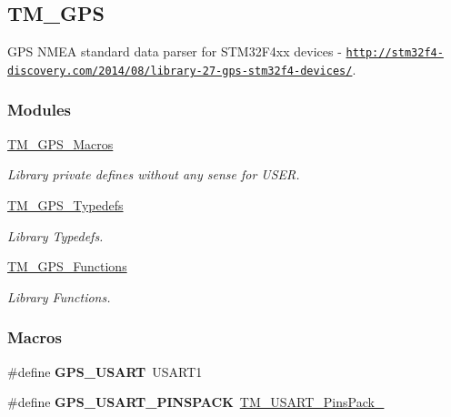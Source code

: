 \hypertarget{group___t_m___g_p_s}{}\subsection{T\+M\+\_\+\+G\+P\+S}
\label{group___t_m___g_p_s}


G\+P\+S N\+M\+E\+A standard data parser for S\+T\+M32\+F4xx devices -\/ \href{http://stm32f4-discovery.com/2014/08/library-27-gps-stm32f4-devices/}{\tt http\+://stm32f4-\/discovery.\+com/2014/08/library-\/27-\/gps-\/stm32f4-\/devices/}.  


\subsubsection*{Modules}
\begin{DoxyCompactItemize}
\item 
\hyperlink{group___t_m___g_p_s___macros}{T\+M\+\_\+\+G\+P\+S\+\_\+\+Macros}
\begin{DoxyCompactList}\small\item\em Library private defines without any sense for U\+S\+E\+R. \end{DoxyCompactList}\item 
\hyperlink{group___t_m___g_p_s___typedefs}{T\+M\+\_\+\+G\+P\+S\+\_\+\+Typedefs}
\begin{DoxyCompactList}\small\item\em Library Typedefs. \end{DoxyCompactList}\item 
\hyperlink{group___t_m___g_p_s___functions}{T\+M\+\_\+\+G\+P\+S\+\_\+\+Functions}
\begin{DoxyCompactList}\small\item\em Library Functions. \end{DoxyCompactList}\end{DoxyCompactItemize}
\subsubsection*{Macros}
\begin{DoxyCompactItemize}
\item 
\hypertarget{group___t_m___g_p_s_ga3507266065ba87b7a44bed0ff6a38615}{}\#define {\bfseries G\+P\+S\+\_\+\+U\+S\+A\+R\+T}~U\+S\+A\+R\+T1\label{group___t_m___g_p_s_ga3507266065ba87b7a44bed0ff6a38615}

\item 
\hypertarget{group___t_m___g_p_s_ga09b04bd0d1aec2755996f5ee6b295d31}{}\#define {\bfseries G\+P\+S\+\_\+\+U\+S\+A\+R\+T\+\_\+\+P\+I\+N\+S\+P\+A\+C\+K}~\hyperlink{group___t_m___u_s_a_r_t___typedefs_ggafa8a506eb27c93db067bb06039ae210fa20e52aedd65d52a8285abf6ea5bda8b1}{T\+M\+\_\+\+U\+S\+A\+R\+T\+\_\+\+Pins\+Pack\+\_}\label{group___t_m___g_p_s_ga09b04bd0d1aec2755996f5ee6b295d31}

\end{DoxyCompactItemize}


